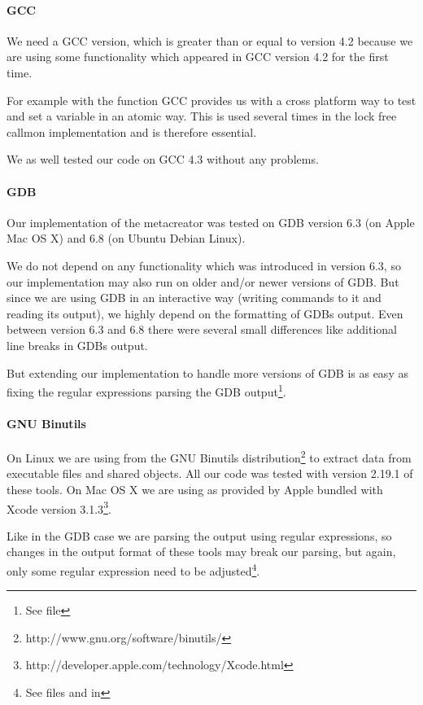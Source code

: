\paragraph{GCC} We need a GCC version, which is greater than or equal to version 4.2 because we are using some functionality which appeared in GCC version 4.2 for the first time.

For example with the function  GCC provides us with a cross platform way to test and set a variable in an atomic way. This is used several times in the lock free callmon implementation and is therefore essential.

We as well tested our code on GCC 4.3 without any problems.

\paragraph{GDB}

Our implementation of the metacreator was tested on GDB version 6.3 (on Apple Mac OS X) and 6.8 (on Ubuntu Debian Linux).

We do not depend on any functionality which was introduced in version 6.3, so our implementation may also run on older and/or newer versions of GDB. But since we are using GDB in an interactive way (writing commands to it and reading its output), we highly depend on the formatting of GDBs output. Even between version 6.3 and 6.8 there were several small differences like additional line breaks in GDBs output.

But extending our implementation to handle more versions of GDB is as easy as fixing the regular expressions parsing the GDB output\footnote{See file }.

\paragraph{GNU Binutils}

On Linux we are using  from the GNU Binutils distribution\footnote{http://www.gnu.org/software/binutils/} to extract data from executable files and shared objects.
All our code was tested with version 2.19.1 of these tools.  On Mac OS X we are using  as provided by Apple bundled with Xcode version 3.1.3\footnote{http://developer.apple.com/technology/Xcode.html}.

Like in the GDB case we are parsing the output using regular expressions, so changes in the output format of these tools may break our parsing, but again, only some regular expression need to be adjusted\footnote{See files
 and  in }.

